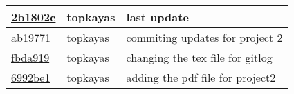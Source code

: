 \begin{tabular}{l l l}
\href{git@github.com:topkayas/CS444/commit/2b1802c27d1698a16d0af379c06764c9615671ca}{2b1802c} & topkayas & last update\\\hline
\href{git@github.com:topkayas/CS444/commit/ab19771e084bd55e0b12ca6d5240ca33f1461146}{ab19771} & topkayas & commiting updates for project 2\\\hline
\href{git@github.com:topkayas/CS444/commit/fbda9191ce05a70288b9e2e0a8051c9378b816e8}{fbda919} & topkayas & changing the tex file for gitlog\\\hline
\href{git@github.com:topkayas/CS444/commit/6992be1f03da6fd53a237575bfa8fb1c043b5573}{6992be1} & topkayas & adding the pdf file for project2\\\hline\end{tabular}
